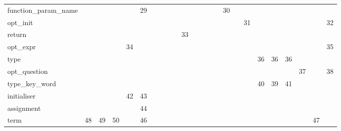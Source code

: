 \begin{table}[htbp]
\begin{tabular}{l|ccccccccccccccccccccccc}
function\_param\_name       &                   &          &          &      & 29 &       &       &         &      &          &        &      &     &                    & 30   &     &     &       &          &          &     &       &         \\
opt\_init                   &                   &          &          &      &    &       &       &         &      &          &        &      &     &                    &      &     & 31  &       &          &          &     &       & 32      \\
return                      &                   &          &          &      &    &       &       &         &      & 33       &        &      &     &                    &      &     &     &       &          &          &     &       &         \\
opt\_expr                   &                   &          &          & 34   &    &       &       &         &      &          &        &      &     &                    &      &     &     &       &          &          &     &       & 35      \\
type                        &                   &          &          &      &    &       &       &         &      &          &        &      &     &                    &      &     &     & 36    & 36       & 36       &     &       &         \\
opt\_question               &                   &          &          &      &    &       &       &         &      &          &        &      &     &                    &      &     &     &       &          &          & 37  &       & 38      \\
type\_key\_word             &                   &          &          &      &    &       &       &         &      &          &        &      &     &                    &      &     &     & 40    & 39       & 41       &     &       &         \\
initialiser                 &                   &          &          & 42   & 43 &       &       &         &      &          &        &      &     &                    &      &     &     &       &          &          &     &       &         \\
assignment                  &                   &          &          &      & 44 &       &       &         &      &          &        &      &     &                    &      &     &     &       &          &          &     &       &         \\
term                        & 48                & 49       & 50       &      & 46 &       &       &         &      &          &        &      &     &                    &      &     &     &       &          &          &     & 47    &         \\

\end{tabular}
\end{table}
